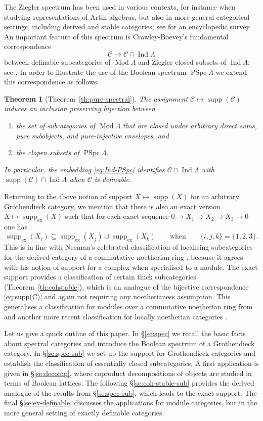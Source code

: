 \documentclass[a4paper]{amsart}
\theoremstyle{plain}
\newtheorem*{Thm}{Theorem}
\theoremstyle{definition}
\theoremstyle{remark}
\numberwithin{equation}{section}
\newcommand{\Ind}{\operatorname{Ind}}
\newcommand{\Mod}{\operatorname{Mod}}
\newcommand{\PSpc}{\operatorname{PSpc}}
\newcommand{\supp}{\operatorname{supp}}
\newcommand{\suppex}{\operatorname{supp}_{\mathrm{ex}}}
\def\C{\mathcal C}
\def\La{\Lambda}
\begin{document}
The Ziegler spectrum has been used in various contexts, for instance
when studying representations of Artin algebras, but also in more
general categorical settings, including derived and stable categories;
see \cite{Pr2009} for an encyclopedic survey. An important feature of
this spectrum is Crawley-Boevey's fundamental correspondence
\[\C\longmapsto\C\cap\Ind\La\]
between definable subcategories of $\Mod\La$ and Ziegler closed
subsets of $\Ind\La$; see \cite{CB1998}.  In order to illustrate the
use of the Boolean spectrum $\PSpc\La$ we extend this correspondence
as follows.

\begin{Thm}[Theorem~\ref{th:pure-spectral}]
  The assignment $\C\mapsto\supp(\C)$ induces an inclusion preserving bijection between
  \begin{enumerate}
  \item the set of subcategories of $\Mod\La$ that are closed under arbitrary
    direct sums, pure subobjects, and pure-injective envelopes, and
  \item the clopen subsets of $\PSpc\La$.
  \end{enumerate}
  In particular, the embedding \eqref{eq:Ind-PSpc} identifies $\C\cap\Ind\La$
with  $\supp(\C)\cap\Ind\La$ when $\C$ is definable.  
\end{Thm}

Returning to the above notion of support $X\mapsto \supp(X)$ for an
arbitrary Grothendieck category, we mention that there is also an
exact version $X\mapsto\suppex(X)$ such that for each exact sequence
$0\to X_1\to X_2\to X_3\to 0$  one
has
\[\suppex(X_i)\subseteq\suppex(X_j)\cup\suppex(X_k)\qquad\text{when}\qquad\{i,j,k\}=\{1,2,3\}.\]
This is in line with Neeman's celebrated classification of localising
subcategories for the derived category of a commutative noetherian
ring \cite{Ne1992}, because it agrees with his notion of support for a
complex when specialised to a module. The exact support provides a
classification of certain thick subcategories
(Theorem~\ref{th:cohstable}), which is an analogue of the bijective
correspondence \eqref{eq:supp(C)} and again not requiring any
noetherianess assumption. This generalises a classification for
modules over a commutative noetherian ring from \cite{Ta2009} and
another more recent classification for locally noetherian categories
\cite{WM2024}.

Let us give a quick outline of this paper. In \S\ref{se:spec} we
recall the basic facts about spectral categories and introduce the
Boolean spectrum of a Grothendieck category. In \S\ref{se:spec-sub} we
set up the support for Grothendieck categories and establish the
classification of essentially closed subcategories. A first
application is given in \S\ref{se:decomp}, where coproduct
decompositions of objects are studied in terms of Boolean lattices.
The following \S\ref{se:coh-stable-sub} provides the derived analogue
of the results from \S\ref{se:spec-sub}, which leads to the exact
support. The final \S\ref{se:ex-definable} discusses the applications
for module categories, but in the more general setting of exactly
definable categories.
\end{document}
